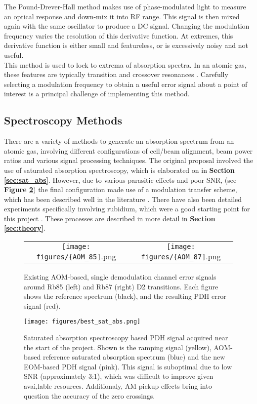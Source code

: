 The Pound-Drever-Hall method makes use of phase-modulated light to measure an optical response and down-mix it into RF range.  This signal is then mixed again with the same oscillator to produce a DC signal. Changing the modulation frequency varies the resolution of this derivative function. At extremes, this derivative function is either small and featureless, or is excessively noisy and not useful. \\

This method is used to lock to extrema of absorption spectra.  In an atomic gas, these features are typically transition and crossover resonances \cite{maguire2006}. Carefully selecting a modulation frequency to obtain a useful error signal about a point of interest is a principal challenge of implementing this method.

\subsection{Spectroscopy Methods}

There are a variety of methods to generate an absorption spectrum from an atomic gas, involving different configurations of cell/beam alignment, beam power ratios and various signal processing techniques. The original proposal involved the use of saturated absorption spectroscopy, which is elaborated on in \textbf{Section \ref{sec:sat_abs}}. However, due to various parasitic effects and poor SNR, (see \textbf{Figure \ref{fig:sat_abs_bad}}) the final configuration made use of a modulation transfer scheme, which has been described well in the literature \cite{Shirley:82}. There have also been detailed experiments specifically involving rubidium, which were a good starting point for this project \cite{0957-0233-19-10-105601}. These processes are described in more detail in \textbf{Section \ref{sec:theory}}.

\begin{figure}
  \begin{tabular}{cc}
    \texttt{[image: figures/\{AOM\_85]}.png} &
    \texttt{[image: figures/\{AOM\_87]}.png} \\
  \end{tabular}
  \caption[Existing AOM-based, error signals]{Existing AOM-based, single demodulation channel error signals around Rb85 (left) and Rb87 (right) D2 transitions. Each figure shows the reference spectrum (black), and the resulting PDH error signal (red).}
  \label{fig:aom_spectra}
\end{figure}

\begin{figure}
    \centering
    \texttt{[image: figures/best\_sat\_abs.png]}
    \caption[Acquired saturated absorption spectroscopy error signals]{Saturated absorption spectroscopy based PDH signal acquired near the start of the project. Shown is the ramping signal (yellow), AOM-based reference saturated absorption spectrum (blue) and the new EOM-based PDH signal (pink). This signal is suboptimal due to low SNR (approximately 3:1), which was difficult to improve given avai,lable resources. Additionaly, AM pickup effects bring into question the accuracy of the zero crossings.}
    \label{fig:sat_abs_bad}
\end{figure}
